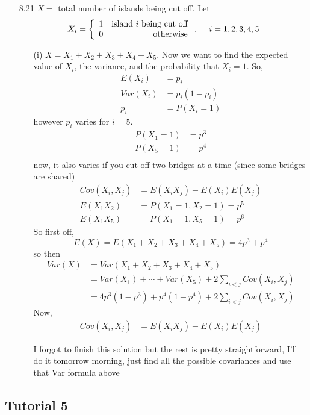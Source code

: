 \documentclass[english, 11pt]{article}
\begin{document}
\begin{itemize}
  \item[8.21]
  $X = $ total number of islands being cut off. Let
    \[ X_i = \left\{ \begin{array}{lr} 1 & \mbox{island $i$ being cut off} \\ 0 & \mbox{otherwise} \end{array} \right., \ \ \ \ i = 1,2,3,4,5 \]
    \begin{itemize}
      \item[(i)] $X = X_1 + X_2 + X_3 + X_4 + X_5$. Now we want to find the expected value of $X_i$, the variance, and the probability that $X_i = 1$. So,
      \begin{align*}
        E(X_i) & = p_i \\
        Var(X_i) & = p_i(1-p_i) \\
        p_i & = P(X_i = 1)
      \end{align*}
      however $p_i$ varies for $i = 5$.
      \begin{align*}
        P(X_1 = 1) & = p^3 \\
        P(X_5 = 1) & = p^4 \\
      \end{align*}
      now, it also varies if you cut off two bridges at a time (since some bridges are shared)
      \begin{align*}
        Cov(X_i, X_j) & = E(X_iX_j) - E(X_i)E(X_j) \\
        E(X_1X_2) & = P(X_1 = 1, X_2 = 1) = p^5 \\
        E(X_1X_5) & = P(X_1 = 1, X_5 = 1) = p^6
      \end{align*}
      So first off,
      \[ E(X) = E(X_1 + X_2 + X_3 + X_4 + X_5) = 4p^3 + p^4 \]
      so then
      \begin{align*}
        Var(X) & = Var(X_1 + X_2 + X_3 + X_4 + X_5) \\
               & = Var(X_1) + \cdots + Var(X_5) + 2\sum_{i < j}Cov(X_i, X_j) \\
               & = 4p^3(1-p^3) + p^4(1-p^4) + 2\sum_{i < j}Cov(X_i, X_j)
      \end{align*}
      Now,
      \begin{align*}
        Cov(X_i, X_j) & = E(X_iX_j) - E(X_i)E(X_j)
      \end{align*}

      I forgot to finish this solution but the rest is pretty straightforward, I'll do it tomorrow morning, just find all the possible covariances and use that Var formula above
    \end{itemize}


  \end{itemize}

  \subsection{Tutorial 5}
\end{document}
